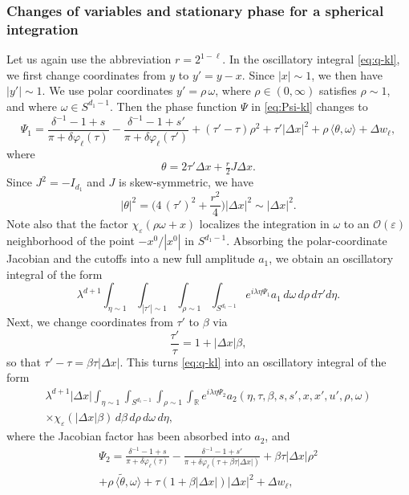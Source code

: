 \documentclass[leqno]{amsart}
\theoremstyle{definition}
\theoremstyle{remark}
\numberwithin{equation}{section}
\newcommand{\R}{\mathbb{R}}
\newcommand\ve{{\varepsilon}}
\begin{document}
\subsubsection{Changes of  variables and  stationary phase for a spherical integration}
Let us again use the abbreviation $r=2^{1-\ell}$. In the oscillatory integral \eqref{eq:q-kl}, we first change coordinates from $y$ to $y'=y-x$.  Since $|x|\sim 1$, we then have $|y'|\sim 1$. We use polar coordinates $y' = \rho\,\omega$, where $\rho\in(0,\infty)$ satisfies $\rho \sim 1$, and where  $\omega\in S^{d_1-1}$. Then  the phase function  $\Psi$ in \eqref{eq:Psi-kl} changes to
\[
\Psi_1
 = \frac{\delta^{-1}-1 + s}{\pi + \delta \varphi_\ell(\tau)}
 - \frac{\delta^{-1}-1 + s'}{\pi + \delta \varphi_\ell(\tau')}
+(\tau'-\tau)\rho^2 + \tau'|\Delta x|^2 + \rho \, \langle\theta ,\omega\rangle 
 + \Delta w_\ell,
\]
where
\[
\theta = 2\tau' \Delta x+\tfrac r2 J\Delta x.
\]
Since $J^2=-I_{d_1}$ and $J$ is skew-symmetric, we have
\[
| \theta|^2
= \Big(4 \, (\tau')^2+\frac {r^2}4 \Big) |\Delta x|^2 
\sim |\Delta x|^2.
\]
Note also that the factor $\chi_{\varepsilon}(\rho\omega + x)$ localizes the integration in $\omega$ to an $\mathcal{O} (\ve)$ neighborhood of the point $-x^0/|x^0|$ in $S^{d_1-1}$. Absorbing the polar-coordinate Jacobian and the cutoffs into a new full amplitude $a_1$, we obtain an oscillatory integral of the form
\[
\lambda^{d+1} \int_{\eta\sim 1} \int_{|\tau'|\sim 1} \int_{\rho\sim1}\int_{S^{d_1-1}}
 e^{i\lambda\eta\Psi_1}  a_1\,d\omega\,d\rho\,d\tau' d\eta.
\]
Next, we change coordinates from $\tau'$ to $\beta$ via
\[
\frac{\tau'}{\tau} = 1 + |\Delta x| \beta ,
\]
so that $\tau'-\tau = \beta\tau |\Delta x|$. This turns \eqref{eq:q-kl} into an oscillatory integral of the form
\begin{multline}\label{eq:change}
\lambda^{d+1}  |\Delta x| \int_{\eta\sim 1} \int_{S^{d_1-1}} \int_{\rho\sim 1}  \int_\R e^{i\lambda\eta \Psi_2} a_2(\eta,\tau,\beta,s,s',x,x',u',\rho,\omega)\\ \times \chi_\varepsilon(|\Delta x|\beta) \,
 d\beta\,  d\rho\, d\omega\,d\eta,
\end{multline}
where the Jacobian factor has been absorbed into $a_2$, and
\begin{multline*}
\Psi_2 = 
 \frac{\delta^{-1}-1 + s}{\pi + \delta \varphi_\ell(\tau)}
- \frac{ \delta^{-1}-1 + s'}{\pi + \delta \varphi_\ell\left(\tau + \beta\tau |\Delta x|\right)}
+\beta\tau \left|\Delta x\right|\rho^2\\
 + \rho \, \langle\tilde\theta ,\omega\rangle +\tau\left(1+ \beta|\Delta x|\right)|\Delta x|^2 + \Delta w_\ell,
\end{multline*}
\end{document}
